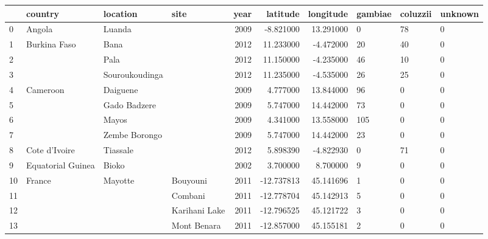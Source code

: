 \begin{tabular}{llllrrrlll}
\toprule
{} &            country &        location &                      site &  year &   latitude &  longitude & gambiae & coluzzii & unknown \\
\midrule
0  &             Angola &          Luanda &                           &  2009 &  -8.821000 &  13.291000 &       0 &       78 &       0 \\
1  &       Burkina Faso &            Bana &                           &  2012 &  11.233000 &  -4.472000 &      20 &       40 &       0 \\
2  &                    &            Pala &                           &  2012 &  11.150000 &  -4.235000 &      46 &       10 &       0 \\
3  &                    &  Souroukoudinga &                           &  2012 &  11.235000 &  -4.535000 &      26 &       25 &       0 \\
4  &           Cameroon &        Daiguene &                           &  2009 &   4.777000 &  13.844000 &      96 &        0 &       0 \\
5  &                    &    Gado Badzere &                           &  2009 &   5.747000 &  14.442000 &      73 &        0 &       0 \\
6  &                    &           Mayos &                           &  2009 &   4.341000 &  13.558000 &     105 &        0 &       0 \\
7  &                    &   Zembe Borongo &                           &  2009 &   5.747000 &  14.442000 &      23 &        0 &       0 \\
8  &      Cote d'Ivoire &        Tiassale &                           &  2012 &   5.898390 &  -4.822930 &       0 &       71 &       0 \\
9  &  Equatorial Guinea &           Bioko &                           &  2002 &   3.700000 &   8.700000 &       9 &        0 &       0 \\
10 &             France &         Mayotte &                  Bouyouni &  2011 & -12.737813 &  45.141696 &       1 &        0 &       0 \\
11 &                    &                 &                   Combani &  2011 & -12.778704 &  45.142913 &       5 &        0 &       0 \\
12 &                    &                 &             Karihani Lake &  2011 & -12.796525 &  45.121722 &       3 &        0 &       0 \\
13 &                    &                 &               Mont Benara &  2011 & -12.857000 &  45.155181 &       2 &        0 &       0 \\

\end{tabular}
